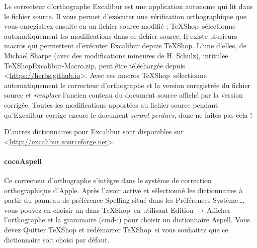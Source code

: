 \documentclass[11pt,french]{article}
\newcommand{\TS}{\textsf{\TeX Shop}}
\newcommand{\cmd}[1]{\textsf{#1}}
\newcommand{\mnu}[1]{\textsf{#1}}
\newcommand{\To}{\,\(\to\)\,}
\begin{document}
Le correcteur d'orthographe \cmd{Excalibur} est une application autonome qui lit dans le fichier source. Il vous permet d'exécuter une vérification orthographique que vous enregistrez ensuite en un fichier source modifié ; \TS\ sélectionne automatiquement les modifications dans ce fichier source. Il existe plusieurs macros qui permettent d'exécuter \cmd{Excalibur} depuis \TS. L'une d'elles, de Michael Sharpe (avec des modifications mineures de H. Schulz), intitulée \cmd{TeXShopExcalibur-Macro.zip}, peut être téléchargée depuis <\url{https://herbs.github.io}>. Avec ces macros \TS\ sélectionne automatiquement le correcteur d'orthographe et la version enregistrée du fichier source et \emph{remplace} l'ancien contenu du document source affiché par la version corrigée. Toutes les modifications apportées au fichier source pendant qu'\cmd{Excalibur} corrige encore le document \emph{seront perdues}, donc ne faites pas cela !

D'autres dictionnaires pour \cmd{Excalibur} sont disponibles sur <\url{http://excalibur.sourceforge.net}>.


\paragraph{\cmd{cocoAspell}}

%

Ce correcteur d'orthographe s'intègre dans le système de correction orthographique d'Apple. Après l'avoir activé et sélectionné les dictionnaires à partir du panneau de préférence \cmd{Spelling} situé dans les \cmd{Préférences Système…}, vous pouvez en choisir un dans \TS\ en utilisant \mnu{Edition}\To\mnu{Afficher l'orthographe et la grammaire} {\NoAutoSpacing(\cmd{cmd-:})} pour choisir un dictionnaire \cmd{Aspell}. Vous devez \cmd{Quitter TeXShop} et redémarrer \TS\ si vous souhaitez que ce dictionnaire soit choisi par défaut.
\end{document}
